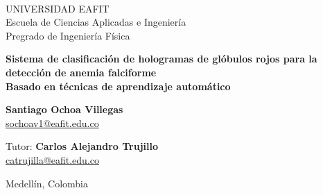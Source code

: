 \
\begin{titlepage}
\centering
{\Large UNIVERSIDAD EAFIT \\[2pt]
Escuela de Ciencias Aplicadas e Ingeniería\\
Pregrado de Ingeniería Física \par}
\vspace{2cm}
{\huge\bfseries Sistema de clasificación de hologramas de glóbulos rojos para la detección de anemia falciforme\\[8pt]
\large Basado en técnicas de aprendizaje automático \par}
\vspace{2cm}
{\Large \textbf{Santiago Ochoa Villegas}\\
\href{mailto:sochoav1@eafit.edu.co}{sochoav1@eafit.edu.co}\par}
\vspace{0.5cm}
{\Large Tutor: \textbf{Carlos Alejandro Trujillo}\\
\href{mailto:catrujilla@eafit.edu.co}{catrujilla@eafit.edu.co}\par}
\vfill
{\Large Medellín, Colombia\\
\the\year\par}
\end{titlepage}
